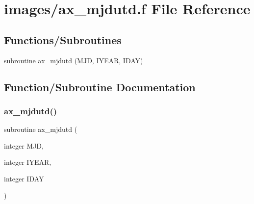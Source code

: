\hypertarget{ax__mjdutd_8f}{}\section{images/ax\+\_\+mjdutd.f File Reference}
\label{ax__mjdutd_8f}
\subsection*{Functions/\+Subroutines}
\begin{DoxyCompactItemize}
\item 
subroutine \hyperlink{ax__mjdutd_8f_a2959c17cd3450160e9da75a745de9e9e}{ax\+\_\+mjdutd} (M\+JD, I\+Y\+E\+AR, I\+D\+AY)
\end{DoxyCompactItemize}


\subsection{Function/\+Subroutine Documentation}
\mbox{\label{ax__mjdutd_8f_a2959c17cd3450160e9da75a745de9e9e}} 
\subsubsection{\texorpdfstring{ax\+\_\+mjdutd()}{ax\_mjdutd()}}
{\footnotesize\ttfamily subroutine ax\+\_\+mjdutd (\begin{DoxyParamCaption}\item[{integer}]{M\+JD,  }\item[{integer}]{I\+Y\+E\+AR,  }\item[{integer}]{I\+D\+AY }\end{DoxyParamCaption})}

